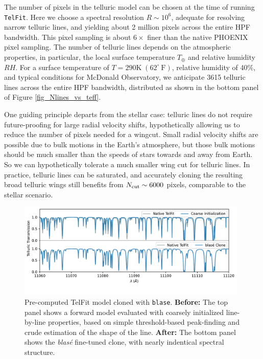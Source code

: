 \documentclass[twocolumn]{aastex631}
\begin{document}
The number of pixels in the telluric model can be chosen at the time of running \texttt{TelFit}.  Here we choose a spectral resolution $R\sim10^6$, adequate for resolving narrow telluric lines, and yielding about 2 million pixels across the entire HPF bandwidth.  This pixel sampling is about $6\times$ finer than the native PHOENIX pixel sampling.  The number of telluric lines depends on the atmospheric properties, in particular, the local surface temperature $T_\oplus$ and relative humidity $RH$.  For a surface temperature of $T=290 \mathrm{K}\; (62^\circ~\mathrm{F})$, relative humidity of 40\%, and typical conditions for McDonald Observatory, we anticipate 3615 telluric lines across the entire HPF bandwidth, distributed as shown in the bottom panel of Figure \ref{fig_Nlines_vs_teff}.

One guiding principle departs from the stellar case: telluric lines do not require future-proofing for large radial velocity shifts, hypothetically allowing us to reduce the number of pixels needed for a wingcut.  Small radial velocity shifts are possible due to bulk motions in the Earth's atmosphere, but those bulk motions should be much smaller than the speeds of stars towards and away from Earth.  So we can hypothetically tolerate a much smaller wing cut for telluric lines.  In practice, telluric lines can be saturated, and accurately cloning the resulting broad telluric wings still benefits from $N_{\rm cut}\sim6000$ pixels, comparable to the stellar scenario.

\begin{figure}[hbt!]
    \centering
    \includegraphics[width=0.98\textwidth]{TelFit_clone_2panel.pdf}
    \caption{Pre-computed TelFit model cloned with \texttt{blase}.  \textbf{Before:} The top panel shows a forward model evaluated with coarsely initialized line-by-line properties, based on simple threshold-based peak-finding and crude estimation of the shape of the line.  \textbf{After:} The bottom panel shows the \emph{blas\'e} fine-tuned clone, with nearly indentical spectral structure.}
    \label{fig_telluric_clone}
\end{figure}
\end{document}
